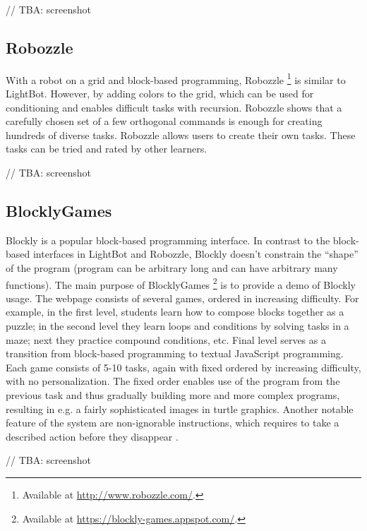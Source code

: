 \documentclass[
    digital,    %
    oneside,    %
    color,
    11pt,
    nocover,
    notable,
    nolof,
    nolot,
    final
]{fithesis3}
\begin{document}
// TBA: screenshot


\subsection{Robozzle}
\label{sec:robozzle}
With a robot on a grid  and block-based programming, Robozzle%
\footnote{Available at \url{http://www.robozzle.com/}.}
is similar to LightBot.
However, by adding colors to the grid, which can be used for conditioning and enables difficult tasks with recursion.
Robozzle shows that a carefully chosen set of a few orthogonal commands is enough for creating hundreds of diverse tasks.
Robozzle allows users to create their own tasks.
These tasks can be tried and rated by other learners.

// TBA: screenshot


\subsection{BlocklyGames}
\label{sec:blockly-games}
Blockly is a popular block-based programming interface.
In contrast to the block-based interfaces in LightBot and Robozzle,
Blockly doesn’t constrain the “shape” of the program
(program can be arbitrary long and can have arbitrary many functions).
The main purpose of BlocklyGames%
\footnote{Available at \url{https://blockly-games.appspot.com/}.}
is to provide a demo of Blockly usage.
The webpage consists of several games, ordered in increasing difficulty.
For example, in the first level, students learn how to compose blocks together as a puzzle;
in the second level they learn loops and conditions by solving tasks in a maze;
next they practice compound conditions, etc.
Final level serves as a transition from block-based programming to textual JavaScript programming.
Each game consists of 5-10 tasks, again with fixed ordered by increasing difficulty, with no personalization.
The fixed order enables use of the program from the previous task and thus gradually building more and more complex programs,
resulting in e.g. a fairly sophisticated images in turtle graphics.
Another notable feature of the system are non-ignorable instructions,
which requires to take a described action before they disappear
\cite{blockly-10-things}.

// TBA: screenshot
\end{document}
